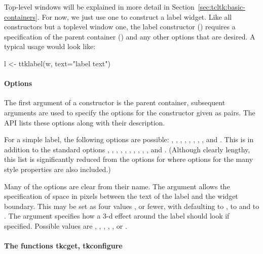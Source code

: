 Top-level windows will be explained in more detail in
Section~\ref{sec:tcltk:basic-containers}. For now, we just use one to
construct a label widget. Like all constructors but a toplevel window
one, the label constructor () requires a
specification of the parent container () and any other options
that are desired. A typical usage would look like:
\begin{Schunk}
\begin{Sinput}
 l <- ttklabel(w, text="label text")
\end{Sinput}
\end{Schunk}

\paragraph{Options}
The first argument of a constructor is the parent container,
subsequent arguments are used to specify the options for the
constructor given as  pairs. The \TK\/ API lists these
options along with their description.

For a simple label, the following options are possible: ,
, , , ,
, , , and .
This is in addition to the standard options ,
, , , ,
, , , ,
, and . (Although clearly lengthy, this
list is significantly reduced from the options for 
where options for the many style properties are also included.)

Many of the options are clear from their name.  The
 argument allows the specification of
space in pixels between the text of the label and the widget
boundary. This may be set as four values , or fewer, with  defaulting to ,
 to  and  to . The
 argument specifies how a 3-d effect around
the label should look if specified. Possible values are ,
, , , , or
.

\paragraph{The functions tkcget, tkconfigure}

